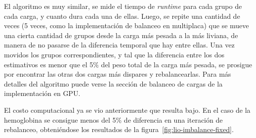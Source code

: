 El algoritmo es muy similar, se mide el tiempo de \textit{runtime} para cada
grupo de cada carga, y cuanto dura cada una de ellas. Luego, se repite una
cantidad de veces (5 veces, como la implementaci\'on de balanceo en multiplaca)
que se mueve una cierta cantidad de grupos desde la carga m\'as pesada a la
m\'as liviana, de manera de no pasarse de la diferencia temporal que hay entre
ellas. Una vez movidos los grupos correspondientes, y tal que la diferencia
entre los dos estimativos es menor que el 5\% del peso total de la carga m\'as
pesada, se prosigue por encontrar las otras dos cargas m\'as dispares y
rebalancearlas. Para m\'as detalles del algoritmo puede verse la secci\'on
de balanceo de cargas de la implementaci\'on en GPU.

El costo computacional ya se vio anteriormente que resulta bajo. En el caso
de la hemoglobina se consigue menos del 5\% de diferencia en una iteraci\'on
de rebalanceo, obteni\'endose los resultados de la figura~\ref{fig:lio-imbalance-fixed}.

